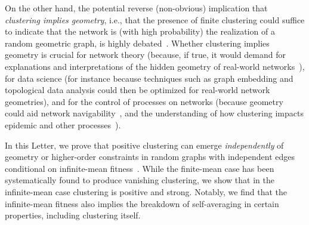 \documentclass[ twocolumn,
 amsmath,amssymb,
 aps, pre, amsthm, amsfonts,
]{revtex4-2}
\begin{document}
On the other hand, the potential reverse (non-obvious) implication that \emph{clustering implies geometry}, i.e., that the presence of finite clustering could suffice to indicate that the network is (with high probability) the realization of a random geometric graph, is highly debated~\cite{krioukov2016clustering, aliakbarisani2025clustering, serrano2006clusteringI, serrano2006clusteringII, boguna2021network, newman2009random, krioukov2010hyperbolic, michielan2022detecting}.
Whether clustering implies geometry is crucial for network theory (because, if true, it would demand for explanations and interpretations of the hidden geometry of real-world networks~\cite{allard2024geometric, boguna2021network}), for data science (for instance because techniques such as graph embedding and topological data analysis could then be optimized for real-world network geometries), and for the control of processes on networks (because geometry could aid network navigability~\cite{krioukov2010hyperbolic,boguna2009navigability,boguna2010sustaining}, and the understanding of how clustering impacts epidemic and other processes~\cite{newman2003properties}). 

In this Letter, we prove that positive clustering can emerge {\em independently} of geometry or higher-order constraints in random graphs with independent edges conditional on infinite-mean fitness~\cite{garuccio2023multiscale, lalli2024geometry}. While the finite-mean case has been systematically found to produce vanishing clustering, we show that in the infinite-mean case clustering is positive and strong. 
Notably, we find that the infinite-mean fitness also implies the breakdown of self-averaging in certain properties, including clustering itself.
\end{document}
